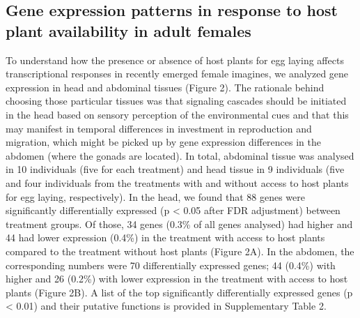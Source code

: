 \documentclass[lineno]{wiley-article}
\begin{document}
\subsection{Gene expression patterns in response to host plant availability in adult females}
To understand how the presence or absence of host plants for egg laying affects transcriptional responses in recently emerged female imagines, we analyzed gene expression in head and abdominal tissues (Figure 2). The rationale behind choosing those particular tissues was that signaling cascades should be initiated in the head based on sensory perception of the environmental cues and that this may manifest in temporal differences in investment in reproduction and migration, which might be picked up by gene expression differences in the abdomen (where the gonads are located). In total, abdominal tissue was analysed in 10 individuals (five for each treatment) and head tissue in 9 individuals (five and four individuals from the treatments with and without access to host plants for egg laying, respectively). In the head, we found that 88 genes were significantly differentially expressed (p < 0.05 after FDR adjustment) between treatment groups. Of those, 34 genes (0.3\% of all genes analysed) had higher and 44 had lower expression (0.4\%) in the treatment with access to host plants compared to the treatment without host plants (Figure 2A). In the abdomen, the corresponding numbers were 70 differentially expressed genes; 44 (0.4\%) with higher and 26 (0.2\%) with lower expression in the treatment with access to host plants (Figure 2B). A list of the top significantly differentially expressed genes (p < 0.01) and their putative functions is provided in Supplementary Table 2.
\end{document}
